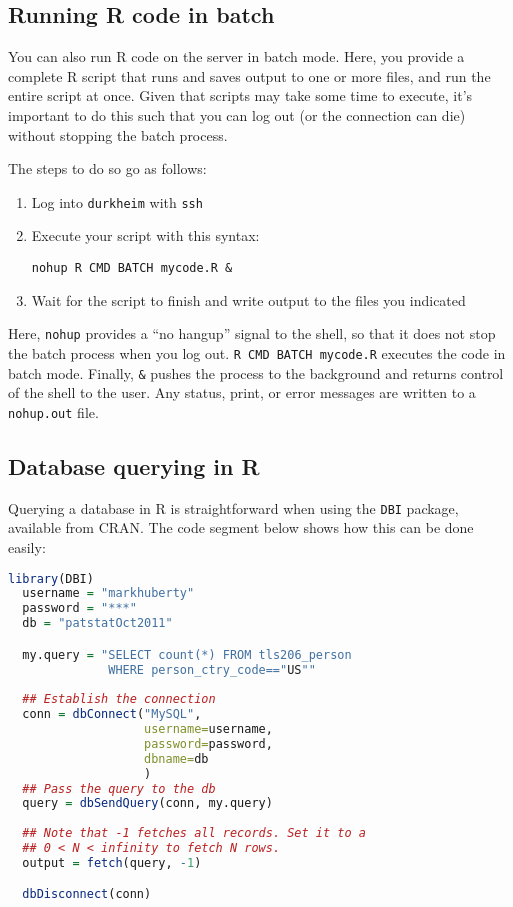 \documentclass[11pt]{article}
\begin{document}
\subsection{Running R code in batch }
\label{sec:running-r-code}

You can also run R code on the server in batch mode. Here, you provide
a complete R script that runs and saves output to one or more files,
and run the entire script at once. Given that scripts may take some
time to execute, it's important to do this such that you can log out
(or the connection can die) without stopping the batch process. 

The steps to do so go as follows:
\begin{enumerate}
\item Log into \texttt{durkheim} with \texttt{ssh}
\item Execute your script with this syntax: 
\begin{verbatim}
nohup R CMD BATCH mycode.R &
\end{verbatim}
\item Wait for the script to finish and write output to the files you indicated
\end{enumerate}

Here, \texttt{nohup} provides a ``no hangup'' signal to the shell, so
that it does not stop the batch process when you log out. \texttt{R
  CMD BATCH mycode.R} executes the code in batch mode. Finally,
\texttt{\&} pushes the process to the background and returns control
of the shell to the user. Any status, print, or error messages are
written to a \texttt{nohup.out} file. 

\subsection{Database querying in R}
\label{sec:database-querying-r}

Querying a database in R is straightforward when using the
\texttt{DBI} package, available from CRAN. The code segment below
shows how this can be done easily: 

\begin{lstlisting}[language=r, numbers=none, frame=single]
  library(DBI)
  username = "markhuberty"
  password = "***"
  db = "patstatOct2011"

  my.query = "SELECT count(*) FROM tls206_person 
              WHERE person_ctry_code=="US""
  
  ## Establish the connection
  conn = dbConnect("MySQL",
                   username=username,
                   password=password,
                   dbname=db
                   )
  ## Pass the query to the db 
  query = dbSendQuery(conn, my.query)
  
  ## Note that -1 fetches all records. Set it to a 
  ## 0 < N < infinity to fetch N rows.
  output = fetch(query, -1)

  dbDisconnect(conn)
\end{lstlisting}
\label{lst:db-query-r}
\end{document}
